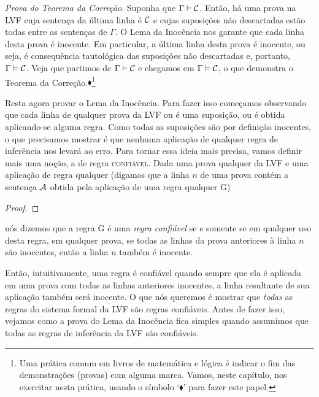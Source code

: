 \emph{Prova do Teorema da Correção}. Suponha que $\Gamma \vdash \mathcal{C}$. Então, há uma prova na LVF cuja sentença da última linha é $\mathcal{C}$ e cujas suposições não descartadas estão todas entre as sentenças de $\Gamma$.
O Lema da Inocência nos garante que cada linha desta prova é inocente.
Em particular, a última linha desta prova é inocente, ou seja, é consequência tautológica das suposições não descartadas e, portanto, $\Gamma \vDash \mathcal{C}$.
Veja que partimos de $\Gamma \vdash \mathcal{C}$ e chegamos em $\Gamma \vDash \mathcal{C}$, o que demonstra o Teorema da Correção.$\blacklozenge$\footnote{
	Uma prática comum em livros de matemática e lógica é indicar o fim das demonstrações (provas) com alguma marca. Vamos, neste capítulo, nos exercitar nesta prática, usando o símbolo `$\blacklozenge$' para fazer este papel.}

Resta agora provar o Lema da Inocência.
Para fazer isso começamos observando que cada linha de qualquer prova da LVF ou é uma suposição, ou é obtida aplicando-se alguma regra.
Como todas as suposições são por definição inocentes, o que precisamos mostrar é que nenhuma aplicação de qualquer regra de inferência nos levará ao erro.
Para tornar essa ideia mais precisa, vamos definir mais uma noção, a de regra \textsc{confiável}.
Dada uma prova qualquer da LVF e uma aplicação de regra qualquer (digamos que a linha $n$ de uma prova contém a sentença $\mathcal{A}$ obtida pela aplicação de uma regra qualquer G)
		   \begin{proof}
		   \end{proof}	   
nós dizemos que a regra G é uma \emph{regra confiável} se e somente se em qualquer uso desta regra, em qualquer prova, se todas as linhas da prova anteriores à linha $n$ são inocentes, então a linha $n$ também é inocente.

Então, intuitivamente, uma regra é confiável quando sempre que ela é aplicada em uma prova com todas as linhas anteriores inocentes, a linha resultante de sua aplicação também será inocente.
O que nós queremos é mostrar que \emph{todas} as regras do sistema formal da LVF são regras confiáveis.
Antes de fazer isso, vejamos como a prova do Lema da Inocência fica simples quando assumimos que todas as regras de inferência da LVF são confiáveis.
	
